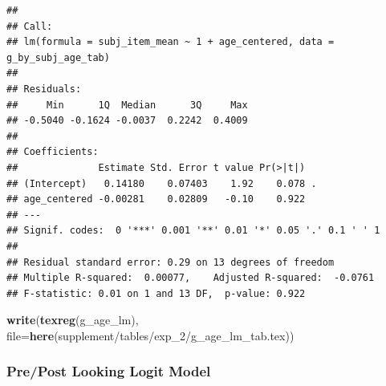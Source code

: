 \documentclass[
  doc,floatsintext]{apa6}
\newenvironment{Shaded}{\begin{snugshade}}{\end{snugshade}}
\newcommand{\AttributeTok}[1]{\textcolor[rgb]{0.13,0.29,0.53}{#1}}
\newcommand{\FunctionTok}[1]{\textcolor[rgb]{0.13,0.29,0.53}{\textbf{#1}}}
\newcommand{\NormalTok}[1]{#1}
\newcommand{\StringTok}[1]{\textcolor[rgb]{0.31,0.60,0.02}{#1}}
\begin{document}
\begin{verbatim}
## 
## Call:
## lm(formula = subj_item_mean ~ 1 + age_centered, data = g_by_subj_age_tab)
## 
## Residuals:
##     Min      1Q  Median      3Q     Max 
## -0.5040 -0.1624 -0.0037  0.2242  0.4009 
## 
## Coefficients:
##              Estimate Std. Error t value Pr(>|t|)  
## (Intercept)   0.14180    0.07403    1.92    0.078 .
## age_centered -0.00281    0.02809   -0.10    0.922  
## ---
## Signif. codes:  0 '***' 0.001 '**' 0.01 '*' 0.05 '.' 0.1 ' ' 1
## 
## Residual standard error: 0.29 on 13 degrees of freedom
## Multiple R-squared:  0.00077,    Adjusted R-squared:  -0.0761 
## F-statistic: 0.01 on 1 and 13 DF,  p-value: 0.922
\end{verbatim}

\begin{Shaded}
\begin{Highlighting}[]
\FunctionTok{write}\NormalTok{(}\FunctionTok{texreg}\NormalTok{(g\_age\_lm), }
      \AttributeTok{file=}\FunctionTok{here}\NormalTok{(}\StringTok{\textquotesingle{}supplement/tables/exp\_2/g\_age\_lm\_tab.tex\textquotesingle{}}\NormalTok{)) }
\end{Highlighting}
\end{Shaded}

\subsubsection{Pre/Post Looking Logit Model}\label{prepost-looking-logit-model}
\end{document}
